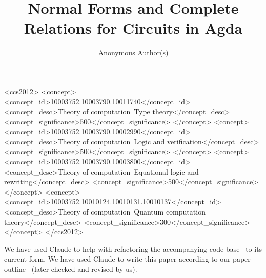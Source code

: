 \documentclass[acmsmall,review,anonymous]{acmart}
\begin{document}
\title{Normal Forms and Complete Relations for Circuits in Agda}

\author{Anonymous Author(s)}

\begin{abstract}

\end{abstract}

\begin{CCSXML}
<ccs2012>
<concept>
<concept_id>10003752.10003790.10011740</concept_id>
<concept_desc>Theory of computation~Type theory</concept_desc>
<concept_significance>500</concept_significance>
</concept>
<concept>
<concept_id>10003752.10003790.10002990</concept_id>
<concept_desc>Theory of computation~Logic and verification</concept_desc>
<concept_significance>500</concept_significance>
</concept>
<concept>
<concept_id>10003752.10003790.10003800</concept_id>
<concept_desc>Theory of computation~Equational logic and rewriting</concept_desc>
<concept_significance>500</concept_significance>
</concept>
<concept>
<concept_id>10003752.10010124.10010131.10010137</concept_id>
<concept_desc>Theory of computation~Quantum computation theory</concept_desc>
<concept_significance>300</concept_significance>
</concept>
</ccs2012>
\end{CCSXML}


\maketitle










\begin{acks}
We have used Claude to help with refactoring the accompanying code
base~\cite{qupit-code} to its current form. We have used Claude to write this
paper according to our paper outline~\cite{paper-outline} (later checked and
revised by us).
\end{acks}



\end{document}
